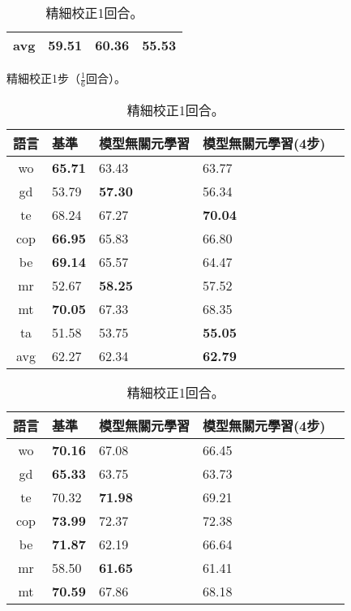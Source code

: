\begin{table}[htbp]
\begin{subtable}[h]{0.8\textwidth}
\begin{tabular}[!ht]{c|lll}
                \hline
                avg & 59.51 & \textbf{60.36} & 55.53 \\
                \hline
            \end{tabular}
        \caption{精細校正1步（$\frac{1}{6}$回合）。}
    \end{subtable}
    \vfill
    \begin{subtable}[h]{0.8\textwidth}
    \centering
        \begin{tabular}[!ht]{c|llll}
            \hline
            語言 & 基準 & 模型無關元學習 & 模型無關元學習(4步) \\
            \hline\hline
            wo & \textbf{65.71} & 63.43 & 63.77 \\
            gd & 53.79 & \textbf{57.30} & 56.34 \\
            te & 68.24 & 67.27 & \textbf{70.04} \\
            cop & \textbf{66.95} & 65.83 & 66.80 \\
            be & \textbf{69.14} & 65.57 & 64.47 \\
            mr & 52.67 & \textbf{58.25} & 57.52 \\
            mt & \textbf{70.05} & 67.33 & 68.35 \\
            ta & 51.58 & 53.75 & \textbf{55.05} \\
            \hline
            avg & 62.27 & 62.34 & \textbf{62.79} \\
            \hline
        \end{tabular}
        \caption{精細校正1回合。}
    \end{subtable}
    \vfill
    \begin{subtable}[h]{0.8\textwidth}
        \centering
            \begin{tabular}[!ht]{c|llll}
                \hline
                語言 & 基準 & 模型無關元學習 & 模型無關元學習(4步) \\
                \hline\hline
                wo & \textbf{70.16} & 67.08 & 66.45 \\
                gd & \textbf{65.33} & 63.75 & 63.73 \\
                te & 70.32 & \textbf{71.98} & 69.21 \\
                cop & \textbf{73.99} & 72.37 & 72.38 \\
                be & \textbf{71.87} & 62.19 & 66.64 \\
                mr & 58.50 & \textbf{61.65} & 61.41 \\
                mt & \textbf{70.59} & 67.86 & 68.18 \\

\end{tabular}
\end{subtable}
\end{table}
